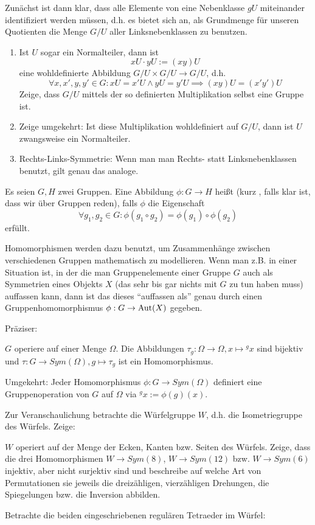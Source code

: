\begin{sheet}
\begin{problem}[title={Quotientengruppen}, difficulty={fortgeschritten}]
Zunächst ist dann klar, dass alle Elemente von eine Nebenklasse $gU$ miteinander identifiziert werden müssen, d.h. es bietet sich an, als Grundmenge für unseren Quotienten die Menge $G/U$ aller Linksnebenklassen zu benutzen.
\begin{enumerate}
\item Ist $U$ sogar ein Normalteiler, dann ist
\[xU \cdot yU := (xy)U\]
eine wohldefinierte Abbildung $G/U \times G/U \to G/U$, d.h.
\[\forall x,x',y,y'\in G: xU=x'U \wedge yU=y'U \implies (xy)U = (x'y')U\]
Zeige, dass $G/U$ mittels der so definierten Multiplikation selbst eine Gruppe ist.
\item Zeige umgekehrt: Ist diese Multiplikation wohldefiniert auf $G/U$, dann ist $U$ zwangsweise ein Normalteiler.
\item Rechts-Links-Symmetrie: Wenn man man Rechts- statt Linksnebenklassen benutzt, gilt genau das analoge.
\end{enumerate}
\end{problem}



\begin{problem}[title={Gruppenhomomorphismen}]
Es seien $G,H$ zwei Gruppen. Eine Abbildung $\phi: G\to H$ heißt  (kurz , falls klar ist, dass wir über Gruppen reden), falls $\phi$ die Eigenschaft
\[\forall g_1,g_2\in G: \phi(g_1\circ g_2) = \phi(g_1)\circ \phi(g_2)\]
erfüllt.

Homomorphismen werden dazu benutzt, um Zusammenhänge zwischen verschiedenen Gruppen mathematisch zu modellieren. Wenn man z.B. in einer Situation ist, in der die man Gruppenelemente einer Gruppe $G$ auch als Symmetrien eines Objekts $X$ (das sehr bis gar nichts mit $G$ zu tun haben muss) auffassen kann, dann ist das dieses \enquote{auffassen als} genau durch einen Gruppenhomomorphismus $\phi: G\to\operatorname{Aut}(X)$ gegeben.

Präziser:
\begin{subproblem}
$G$ operiere auf einer Menge $\Omega$. Die Abbildungen $\tau_g: \Omega\to\Omega, x\mapsto{^g x}$ sind bijektiv und $\tau: G\to Sym(\Omega), g\mapsto\tau_g$ ist ein Homomorphismus.

Umgekehrt: Jeder Homomorphismus $\phi: G\to Sym(\Omega)$ definiert eine Gruppenoperation von $G$ auf $\Omega$ via ${^g x} := \phi(g)(x)$.
\end{subproblem}

Zur Veranschaulichung betrachte die Würfelgruppe $W$, d.h. die Isometriegruppe des Würfels. Zeige:
\begin{subproblem}
$W$ operiert auf der Menge der Ecken, Kanten bzw. Seiten des Würfels. Zeige, dass die drei Homomorphismen $W\to Sym(8)$, $W\to Sym(12)$ bzw. $W\to Sym(6)$ injektiv, aber nicht surjektiv sind und beschreibe auf welche Art von Permutationen sie jeweils die dreizähligen, vierzähligen Drehungen, die Spiegelungen bzw. die Inversion abbilden.
\end{subproblem}
\begin{subproblem}
Betrachte die beiden eingeschriebenen regulären Tetraeder im Würfel:


\end{subproblem}
\end{problem}
\end{sheet}
